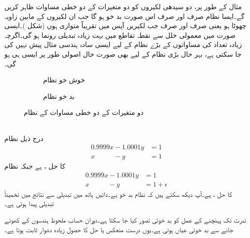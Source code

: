 مثال کے طور پر، دو سیدھی لکیروں کو دو متغیرات کے دو خطی مساوات ظاہر کریں گے۔ایسا نظام صرف اور صرف اس صورت بد خو ہو گا جب ان لکیروں کے مابین زاویہ  چھوٹا ہو یعنی صرف اور صرف جب لکیریں آپس میں تقریباً متوازی ہوں (شکل )۔ایسی صورت میں معمولی خلل سے نقطہ تقاطع میں بہت زیادہ تبدیلی رونما ہو گی۔اگرچہ زیادہ تعداد کی مساواتوں کے بڑے نظام کے لیے ایسی سادہ ہندسی مثال پیش نہیں کی جا سکتی ہے، بہر حال بڑی نظام کے لیے بھی  صورت حال اصولی طور پر ایسی ہی ہو گی۔ 
\begin{figure}
\centering
\begin{subfigure}{0.45\textwidth}
\centering
{}
\caption{ خوش خو نظام}
\end{subfigure} \hfill
\begin{subfigure}{0.45\textwidth}
\centering
{}
\caption{ بد خو نظام}
\end{subfigure} \hfill
\caption{دو متغیرات کے دو خطی مساوات کے نظام}
\label{شکل_خطی_اعدادی_بد_خو_خوش_خو}
\end{figure}

\quad {}\\
درج ذیل نظام
\begin{align*}
0.9999x-1.0001y&=1\\
x\phantom{1.0000}-y&=1
\end{align*}
کا حل ،  ہے جبکہ نظام
\begin{align*}
0.9999x-1.0001y&=1\\
x\phantom{1.0000}-y&=1+\epsilon
\end{align*}
کا حل ،  ہے۔آپ دیکھ سکتے ہیں کہ نظام بد خو ہے۔دائیں ہاتھ میں  تبدیلی سے نتائج میں تخمیناً   تبدیلی پیدا ہوتی ہے۔

ندرت تک پہنچنے کے عمل کو بد خوئی تصور کیا جا سکتا ہے۔دوران حساب ملحوظ ہندسوں کے کھوئے جانے سے بد خوئی عیاں ہوتی ہے۔یوں درست منعکس یا حل کا حصول زیادہ دشوار ثابت ہوتا ہے۔

